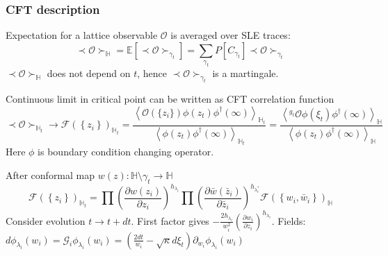 \documentclass[pdftex]{beamer}
\theoremstyle{definition} \newtheorem{Def}{Definition}
\begin{document}
\begin{frame}
  \frametitle{CFT description}
  Expectation for a lattice observable $\mathcal{O}$ is averaged over SLE traces:
  \begin{equation*}
    \prec \mathcal{O} \succ_{\mathbb{H}}=\mathbb{E}\left[\prec\mathcal{O}\succ_{\gamma_{t}}\right]=\sum_{\gamma_{t}} P\left[C_{\gamma_{t}}\right] \prec \mathcal{O} \succ_{\gamma_{t}}
  \end{equation*}
  $\prec \mathcal{O} \succ_{\mathbb{H}}$ does not depend on $t$, hence $\prec\mathcal{O}\succ_{\gamma_{t}}$ is a martingale.

  Continuous limit in critical point can be written as CFT correlation function
  \begin{equation*}
    \prec \mathcal{O} \succ_{\mathbb{H}_{t}}\to \mathcal{F}(\left\{z_{i}\right\})_{\mathbb{H}_{t}}=
    \frac{\left< \mathcal{O}(\{z_{i}\})\phi(z_{t})\phi^{\dagger}(\infty)\right>_{\mathbb{H}_{t}}}{\left<\phi(z_{t})\phi^{\dagger}(\infty)\right>_{\mathbb{H}_{t}}}=
    \frac{\left< ^{g_{t}}\mathcal{O}\phi(\xi_{t})\phi^{\dagger}(\infty)\right>_{\mathbb{H}}}{\left<\phi(z_{t})\phi^{\dagger}(\infty)\right>_{\mathbb{H}}}
  \end{equation*}
  Here $\phi$ is boundary condition changing operator. 


   After conformal map $w(z):\mathbb{H}\setminus\gamma_{t}\to \mathbb{H}$
  \begin{equation*}
    \mathcal{F}(\left\{z_{i}\right\})_{\mathbb{H}_{t}}=\prod \left(\frac{\partial w(z_{i})}{\partial z_{i}}\right)^{h_{\lambda_i}} 
    \prod \left(\frac{\partial \bar w(\bar z_{i})}{\partial \bar z_{i}}\right)^{h_{\lambda^{*}_i}}
        \mathcal{F}(\left\{w_{i}, \bar w_{i}\right\})_{\mathbb{H}}
  \end{equation*}
  Consider evolution  $t \to t+dt$. First factor gives $-\frac{2h_{\lambda_{i}}}{w_{i}^{2}}\left(\frac{\partial w_{i}}{\partial z_{i}}\right)^{h_{\lambda_{i}}}$. Fields:
$d\phi_{\lambda_{i}}(w_{i}) = \mathcal{G}_{i}\phi_{\lambda_{i}}(w_{i})=\left(\frac{2dt}{w_{i}}-\sqrt{\kappa} d\xi_{t}\right) \partial_{w_{i}}\phi_{\lambda_{i}}(w_{i})$
\end{frame}
\end{document}
